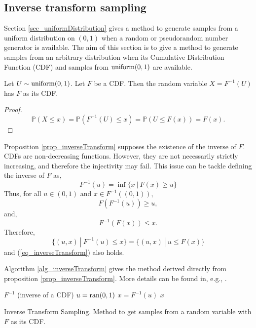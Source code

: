 \subsection{Inverse transform sampling} \label{sec_inverseTransformSampling}

Section \ref{sec_uniformDistribution} gives a method to generate samples from a uniform distribution on $(0,1)$ when a random or pseudorandom number generator is available. The aim of this section is to give a method to generate samples from an arbitrary distribution when its Cumulative Distribution Function (CDF) and samples from $\textup{uniform}(0,1)$ are available.

\begin{proposition} \label{prop_inverseTransform}
  Let $U \sim \textup{uniform}(0,1)$. Let $F$ be a CDF. Then the random variable $X = F^{-1}(U)$ has $F$ as its CDF.
\begin{proof}
  \begin{equation} \label{eq_inverseTransform}
    \mathbb{P}(X \leq x) = \mathbb{P}(F^{-1}(U) \leq x) = \mathbb{P}(U \leq F(x)) = F(x).
  \end{equation}
\end{proof}
\end{proposition}

\begin{remark} \label{remark_generalizedInverse}
  Proposition \ref{prop_inverseTransform} supposes the existence of the inverse of $F$. CDFs are non-decreasing functions. However, they are not necessarily strictly increasing, and therefore the injectivity may fail. This issue can be tackle defining the inverse of $F$ as,
  $$
    F^{-1}(u) = \inf \{ x \ | \ F(x) \geq u \}
  $$
Thus, for all $u \in (0,1)$ and $x \in F^{-1}((0,1))$,
  $$
    F(F^{-1}(u)) \geq u,
  $$
 and,
  $$
    F^{-1}(F(x)) \leq x.
  $$
Therefore, 
  $$
    \{(u,x) \ | \ F^{-1}(u) \leq x  \} = \{(u,x) \ | \ u \leq F(x) \}
  $$
and (\ref{eq_inverseTransform}) also holds.
\end{remark}

Algorithm \ref{alg_inverseTransform} gives the method derived directly from proposition \ref{prop_inverseTransform}. More details can be found in, e.g., \textcite{robert2004}.

\vspace{5mm}
\begin{algorithm}[H]
\SetAlgoLined
   $F^{-1}$ (inverse of a CDF)\;   
  $u = \textup{ran}(0,1)$\;
  $x = F^{-1}(u)$\;
   $x$\;
\caption[Inverse Transform Sampling]
{
  Inverse Transform Sampling. Method to get samples from a random variable with $F$ as its CDF.
}
\label{alg_inverseTransform}
\end{algorithm}
\vspace{5mm}

